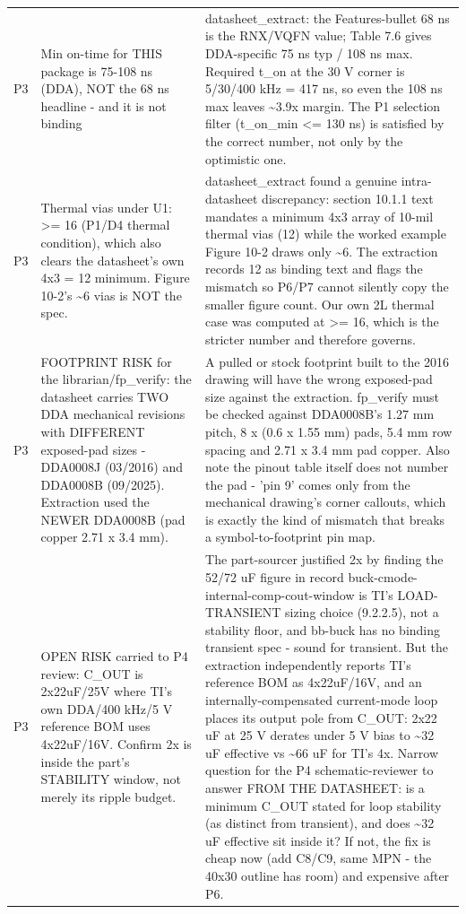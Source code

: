 \documentclass[11pt,a4paper]{article}
\begin{document}
{\begin{longtable}{lp{5.2cm}p{7.2cm}}
P3 & Min on-time for THIS package is 75-108 ns (DDA), NOT the 68 ns headline - and it is not binding & datasheet\_extract: the Features-bullet 68 ns is the RNX/VQFN value; Table 7.6 gives DDA-specific 75 ns typ / 108 ns max. Required t\_on at the 30 V corner is 5/30/400 kHz = 417 ns, so even the 108 ns max leaves \textasciitilde{}3.9x margin. The P1 selection filter (t\_on\_min \textless{}= 130 ns) is satisfied by the correct number, not only by the optimistic one. \\
P3 & Thermal vias under U1: \textgreater{}= 16 (P1/D4 thermal condition), which also clears the datasheet's own 4x3 = 12 minimum. Figure 10-2's \textasciitilde{}6 vias is NOT the spec. & datasheet\_extract found a genuine intra-datasheet discrepancy: section 10.1.1 text mandates a minimum 4x3 array of 10-mil thermal vias (12) while the worked example Figure 10-2 draws only \textasciitilde{}6. The extraction records 12 as binding text and flags the mismatch so P6/P7 cannot silently copy the smaller figure count. Our own 2L thermal case was computed at \textgreater{}= 16, which is the stricter number and therefore governs. \\
P3 & FOOTPRINT RISK for the librarian/fp\_verify: the datasheet carries TWO DDA mechanical revisions with DIFFERENT exposed-pad sizes - DDA0008J (03/2016) and DDA0008B (09/2025). Extraction used the NEWER DDA0008B (pad copper 2.71 x 3.4 mm). & A pulled or stock footprint built to the 2016 drawing will have the wrong exposed-pad size against the extraction. fp\_verify must be checked against DDA0008B's 1.27 mm pitch, 8 x (0.6 x 1.55 mm) pads, 5.4 mm row spacing and 2.71 x 3.4 mm pad copper. Also note the pinout table itself does not number the pad - 'pin 9' comes only from the mechanical drawing's corner callouts, which is exactly the kind of mismatch that breaks a symbol-to-footprint pin map. \\
P3 & OPEN RISK carried to P4 review: C\_OUT is 2x22uF/25V where TI's own DDA/400 kHz/5 V reference BOM uses 4x22uF/16V. Confirm 2x is inside the part's STABILITY window, not merely its ripple budget. & The part-sourcer justified 2x by finding the 52/72 uF figure in record buck-cmode-internal-comp-cout-window is TI's LOAD-TRANSIENT sizing choice (9.2.2.5), not a stability floor, and bb-buck has no binding transient spec - sound for transient. But the extraction independently reports TI's reference BOM as 4x22uF/16V, and an internally-compensated current-mode loop places its output pole from C\_OUT: 2x22 uF at 25 V derates under 5 V bias to \textasciitilde{}32 uF effective vs \textasciitilde{}66 uF for TI's 4x. Narrow question for the P4 schematic-reviewer to answer FROM THE DATASHEET: is a minimum C\_OUT stated for loop stability (as distinct from transient), and does \textasciitilde{}32 uF effective sit inside it? If not, the fix is cheap now (add C8/C9, same MPN - the 40x30 outline has room) and expensive after P6. \\

\end{longtable}}
\end{document}
